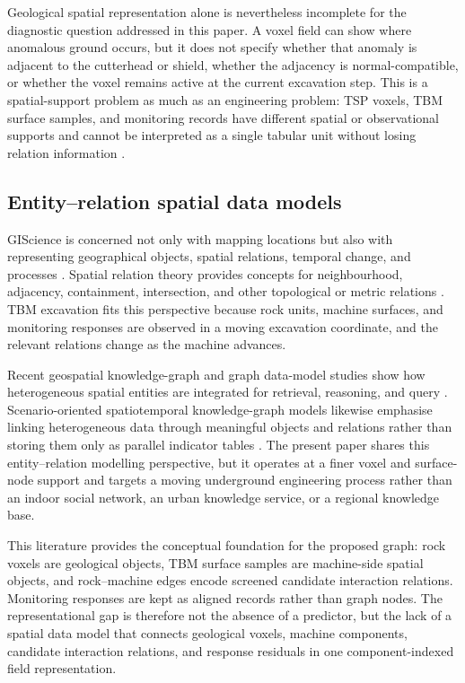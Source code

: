 Geological spatial representation alone is nevertheless incomplete for the
diagnostic question addressed in this paper. A voxel field can show where
anomalous ground occurs, but it does not specify whether that anomaly is
adjacent to the cutterhead or shield, whether the adjacency is
normal-compatible, or whether the voxel remains active at the current
excavation step. This is a spatial-support problem as much as an engineering
problem: TSP voxels, TBM surface samples, and monitoring records have
different spatial or observational supports and cannot be interpreted as a
single tabular unit without losing relation information
\citep{goodchild1992geographical,longley2005geographic,openshaw1984modifiable}.

\subsection{Entity--relation spatial data models}
GIScience is concerned not only with mapping locations but also with
representing geographical objects, spatial relations, temporal change, and
processes \citep{goodchild1992geographical,worboys2004gis,galton2001spatial}.
Spatial relation theory provides concepts for neighbourhood, adjacency,
containment, intersection, and other topological or metric relations
\citep{egenhofer1991point,wu2008contiguity}. TBM excavation fits this
perspective because rock units, machine surfaces, and monitoring responses are
observed in a moving excavation coordinate, and the relevant relations change
as the machine advances.

Recent geospatial knowledge-graph and graph data-model studies show how
heterogeneous spatial entities are integrated for retrieval, reasoning, and
query \citep{zhu2026knowwheregraph,xu2025spatiotemporal,li2025question,rahimi2021topology}.
Scenario-oriented spatiotemporal knowledge-graph models likewise emphasise
linking heterogeneous data through meaningful objects and relations rather
than storing them only as parallel indicator tables
\citep{wang2025urbanphysical}. The present paper shares this entity--relation
modelling perspective, but it operates at a finer voxel and surface-node
support and targets a moving underground engineering process rather than an
indoor social network, an urban knowledge service, or a regional knowledge
base.

This literature provides the conceptual foundation for the proposed graph:
rock voxels are geological objects, TBM surface samples are machine-side
spatial objects, and rock--machine edges encode screened candidate interaction
relations. Monitoring responses are kept as aligned records rather than graph
nodes. The representational gap is therefore not the absence of a predictor,
but the lack of a spatial data model that connects geological voxels, machine
components, candidate interaction relations, and response residuals in one
component-indexed field representation.

